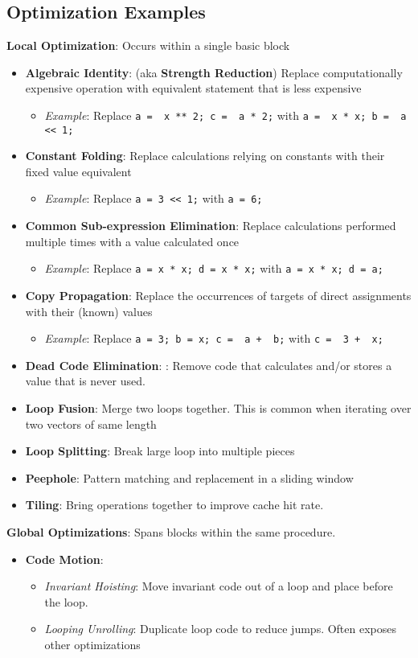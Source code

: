 \documentclass[10pt,twocolumn]{report}
\newcommand{\red}[1]{{\color{red} #1}}
\begin{document}
  \subsection*{Optimization Examples}

  \newcommand{\longopt}[4]{\item \textbf{#1}: #2\vspace{-6pt}\begin{itemize} \item \textit{Example}: Replace \texttt{{#3}} with \texttt{{#4}} \end{itemize}}
  \newcommand{\shortopt}[2]{\item \textbf{#1}: #2}
  \textbf{Local Optimization}: Occurs within a single basic block
  \begin{itemize}
    \setlength{\itemsep}{0pt}
    \longopt{Algebraic Identity}{(aka \textbf{Strength Reduction}) Replace computationally expensive operation with equivalent statement that is less expensive}{a = \red{x ** 2}; c = \red{a * 2};}{a = \red{x * x}; b = \red{a << 1};}
    \longopt{Constant Folding}{Replace calculations relying on constants with their fixed value equivalent}{a = 3 << 1;}{a = 6;}
    \longopt{Common Sub-expression Elimination}{Replace calculations performed multiple times with a value calculated once}{a = x * x; d = x * x;}{a = x * x; d = a;}
    \longopt{Copy Propagation}{Replace the occurrences of targets of direct assignments with their (known) values}{a = 3; b = x; c = \red{a} + \red{b};}{c = \red{3} + \red{x};}
    \shortopt{Dead Code Elimination}: Remove code that calculates and/or stores a value that is never used.
    \shortopt{Loop Fusion}{Merge two loops together. This is common when iterating over two vectors of same length}
    \shortopt{Loop Splitting}{Break large loop into multiple pieces}
    \shortopt{Peephole}{Pattern matching and replacement in a sliding window}
    \shortopt{Tiling}{Bring operations together to improve cache hit rate.}
  \end{itemize}

  \textbf{Global Optimizations}: Spans blocks within the same procedure.
  \begin{itemize}
    \item  \textbf{Code Motion}:
    \begin{itemize}
      \item \textit{Invariant Hoisting}: Move invariant code out of a loop and place before the loop.
      \item \textit{Looping Unrolling}: Duplicate loop code to reduce jumps.  Often exposes other optimizations
    \end{itemize}
  \end{itemize}
\end{document}
